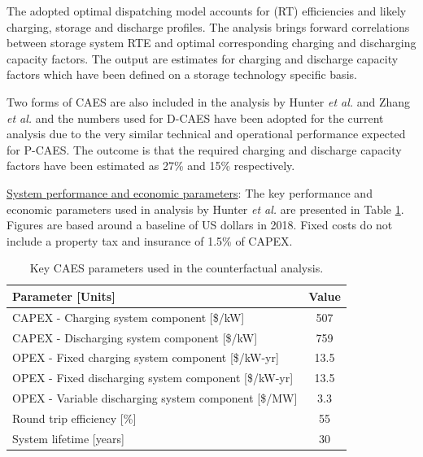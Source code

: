 \documentclass[preprint,12pt]{elsarticle}
\begin{document}
The adopted optimal dispatching model accounts for (RT) efficiencies and likely charging, storage and discharge profiles. The analysis brings forward correlations between storage system RTE and optimal corresponding charging and discharging capacity factors. The output are estimates for charging and discharge capacity factors which have been defined on a storage technology specific basis. 

Two forms of CAES are also included in the analysis by Hunter \textit{et al.} \cite{HUNTER20212077} and Zhang \textit{et al.} \cite{Zhangetal} and the numbers used for D-CAES have been adopted for the current analysis due to the very similar technical and operational performance expected for P-CAES. The outcome is that the required charging and discharge capacity factors have been estimated as 27\% and 15\% respectively. 

\underline{System performance and economic parameters}: The key performance and economic parameters used in analysis by Hunter \textit{et al.} \cite{HUNTER20212077} are presented in Table \ref{tab:CounterfactualCosts}. Figures are based around a baseline of US dollars in 2018. Fixed costs do not include a property tax and insurance of 1.5\% of CAPEX.

\begin{table}[h]
\centering
\begin{tabular}{l c}
\toprule
\textbf{Parameter [Units]} & \textbf{Value}\\
\midrule
CAPEX - Charging system component [\$/kW]	& 507 \\
CAPEX - Discharging system component [\$/kW] & 759 \\
\midrule
OPEX - Fixed charging system component [\$/kW-yr] & 13.5 \\
OPEX - Fixed discharging system component [\$/kW-yr] & 13.5 \\
OPEX - Variable discharging system component [\$/MW] & 3.3 \\
\midrule
Round trip efficiency [\%]	& 55\\
System lifetime [years]	& 30\\
\bottomrule
\end{tabular}
\caption{Key CAES parameters \cite{HUNTER20212077} used in the counterfactual analysis.}

\label{tab:CounterfactualCosts} %
\end{table}
\end{document}
